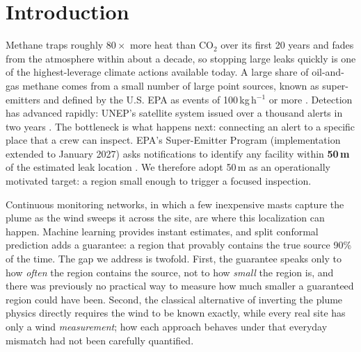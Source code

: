 \documentclass[conference]{IEEEtran}
\begin{document}
\section{Introduction}
Methane traps roughly $80\times$ more heat than CO$_2$ over its first 20
years and fades from the atmosphere within about a decade, so stopping
large leaks quickly is one of the highest-leverage climate actions
available today. A large share of oil-and-gas methane comes from a small
number of large point sources, known as super-emitters and defined by the
U.S. EPA as events of 100\,kg\,h$^{-1}$ or more \cite{epa}. Detection has advanced
rapidly: UNEP's satellite system issued over a thousand alerts in two
years \cite{unep}. The bottleneck is what happens next: connecting an
alert to a specific place that a crew can inspect. EPA's Super-Emitter Program (implementation
extended to January 2027) asks notifications to identify any facility
within \textbf{50\,m} of the estimated leak location \cite{epa}. We therefore adopt
50\,m as an operationally motivated target: a region small enough to
trigger a focused inspection.

Continuous monitoring networks, in which a few inexpensive masts
capture the plume as the wind sweeps it across the site, are where this
localization can happen. Machine learning provides instant estimates,
and split conformal prediction \cite{conformal} adds a guarantee: a
region that provably contains the true source 90\% of the time. The gap we address is twofold.
First, the guarantee speaks only to how \emph{often} the region contains
the source, not to how \emph{small} the region is, and there was
previously no practical way to measure how much smaller a guaranteed
region could have been. Second, the classical alternative of inverting the
plume physics directly requires the wind to be known exactly, while every
real site has only a wind \emph{measurement}; how each approach behaves
under that everyday mismatch had not been carefully quantified.
\end{document}
